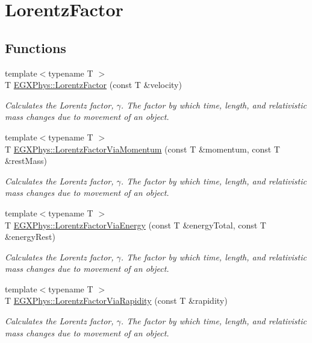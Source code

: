 \hypertarget{group___lorentz_factor}{}\section{Lorentz\+Factor}
\label{group___lorentz_factor}
\subsection*{Functions}
\begin{DoxyCompactItemize}
\item 
{\footnotesize template$<$typename T $>$ }\\T \hyperlink{group___lorentz_factor_ga5f9b11c1f4c3ae26a7e64f02c22d5a75}{E\+G\+X\+Phys\+::\+Lorentz\+Factor} (const T \&velocity)
\begin{DoxyCompactList}\small\item\em Calculates the Lorentz factor, $\gamma$. The factor by which time, length, and relativistic mass changes due to movement of an object. \end{DoxyCompactList}\item 
{\footnotesize template$<$typename T $>$ }\\T \hyperlink{group___lorentz_factor_ga1ea24128654ac333dd843afdd5c003b7}{E\+G\+X\+Phys\+::\+Lorentz\+Factor\+Via\+Momentum} (const T \&momentum, const T \&rest\+Mass)
\begin{DoxyCompactList}\small\item\em Calculates the Lorentz factor, $\gamma$. The factor by which time, length, and relativistic mass changes due to movement of an object. \end{DoxyCompactList}\item 
{\footnotesize template$<$typename T $>$ }\\T \hyperlink{group___lorentz_factor_ga601de8c039be89a9abea22bc459436c9}{E\+G\+X\+Phys\+::\+Lorentz\+Factor\+Via\+Energy} (const T \&energy\+Total, const T \&energy\+Rest)
\begin{DoxyCompactList}\small\item\em Calculates the Lorentz factor, $\gamma$. The factor by which time, length, and relativistic mass changes due to movement of an object. \end{DoxyCompactList}\item 
{\footnotesize template$<$typename T $>$ }\\T \hyperlink{group___lorentz_factor_ga8064f5bce1d2ca5f7bc39d95ba4d2dd9}{E\+G\+X\+Phys\+::\+Lorentz\+Factor\+Via\+Rapidity} (const T \&rapidity)
\begin{DoxyCompactList}\small\item\em Calculates the Lorentz factor, $\gamma$. The factor by which time, length, and relativistic mass changes due to movement of an object. \end{DoxyCompactList}\end{DoxyCompactItemize}


